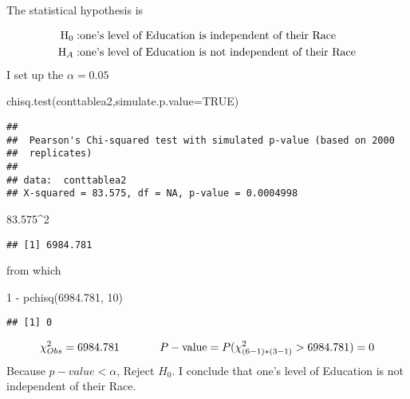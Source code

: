 \documentclass[
]{article}
\newenvironment{Shaded}{\begin{snugshade}}{\end{snugshade}}
\newcommand{\AttributeTok}[1]{\textcolor[rgb]{0.77,0.63,0.00}{#1}}
\newcommand{\ConstantTok}[1]{\textcolor[rgb]{0.00,0.00,0.00}{#1}}
\newcommand{\DecValTok}[1]{\textcolor[rgb]{0.00,0.00,0.81}{#1}}
\newcommand{\FloatTok}[1]{\textcolor[rgb]{0.00,0.00,0.81}{#1}}
\newcommand{\FunctionTok}[1]{\textcolor[rgb]{0.00,0.00,0.00}{#1}}
\newcommand{\NormalTok}[1]{#1}
\newcommand{\SpecialCharTok}[1]{\textcolor[rgb]{0.00,0.00,0.00}{#1}}
\begin{document}
The statistical hypothesis is

\[
\begin{align}
{\rm H}_{0}: & \text{one’s level of Education is independent of their Race} \\
{\rm H}_{A}: & \text{one’s level of Education is not independent of their Race} \\
\end{align}
\] I set up the \(\alpha = 0.05\)

\begin{Shaded}
\begin{Highlighting}[]
\FunctionTok{chisq.test}\NormalTok{(conttablea2,}\AttributeTok{simulate.p.value=}\ConstantTok{TRUE}\NormalTok{)}
\end{Highlighting}
\end{Shaded}

\begin{verbatim}
## 
##  Pearson's Chi-squared test with simulated p-value (based on 2000
##  replicates)
## 
## data:  conttablea2
## X-squared = 83.575, df = NA, p-value = 0.0004998
\end{verbatim}

\begin{Shaded}
\begin{Highlighting}[]
\FloatTok{83.575}\SpecialCharTok{\^{}}\DecValTok{2}
\end{Highlighting}
\end{Shaded}

\begin{verbatim}
## [1] 6984.781
\end{verbatim}

from which

\begin{Shaded}
\begin{Highlighting}[]
\DecValTok{1} \SpecialCharTok{{-}} \FunctionTok{pchisq}\NormalTok{(}\FloatTok{6984.781}\NormalTok{, }\DecValTok{10}\NormalTok{)}
\end{Highlighting}
\end{Shaded}

\begin{verbatim}
## [1] 0
\end{verbatim}

\[
\chi^{2}_{Obs} = 6984.781 \hspace{0.5in} P-\text{value} = P(\chi^{2}_{(6-1)*(3-1)} > 6984.781) = 0
\] Because \(p-value < \alpha\), Reject \(H_{0}\). I conclude that one's
level of Education is not independent of their Race.
\end{document}
